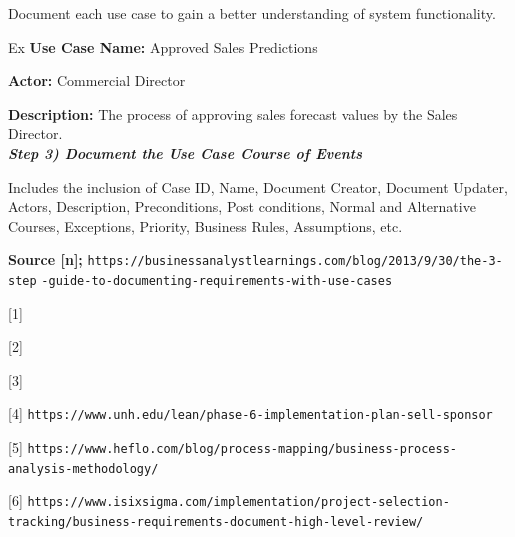 \documentclass{article}
\newcounter{subsubsubsection}[subsubsection]
\begin{document}
{\vspace{0.25cm}

Document each use case to gain a better understanding of system functionality. 

\hspace{-0.65cm} Ex \textbf{Use Case Name:} Approved Sales Predictions 

\textbf{Actor:} Commercial Director
 
\textbf{Description:} The process of approving sales forecast values by the Sales Director. \\

\textbf{\textit{Step 3) Document the Use Case Course of Events}}

\vspace{0.25cm}

Includes the inclusion of Case ID, Name, Document Creator, Document Updater, Actors, Description, Preconditions, Post conditions, Normal and Alternative Courses, Exceptions, Priority, Business Rules, Assumptions, etc.

\vspace{0.15cm}

\vspace{3.35cm}

\hspace{-0.65cm} \textbf{Source [n];} \hspace{0.35cm} \texttt{https://businessanalystlearnings.com/blog/2013/9/30/the-3-step}
\texttt{-guide-to-documenting-requirements-with-use-cases} 


}


\newpage


[1] \texttt{}

\hspace{-0.63cm} [2] \texttt{}

\hspace{-0.63cm} [3] \texttt{}

\hspace{-0.63cm} [4] \texttt{https://www.unh.edu/lean/phase-6-implementation-plan-sell-sponsor}

\hspace{-0.63cm} [5]  \texttt{https://www.heflo.com/blog/process-mapping/business-process-analysis-methodology/}

\hspace{-0.63cm} [6] \texttt{https://www.isixsigma.com/implementation/project-selection-tracking/business-requirements-document-high-level-review/}
\end{document}
